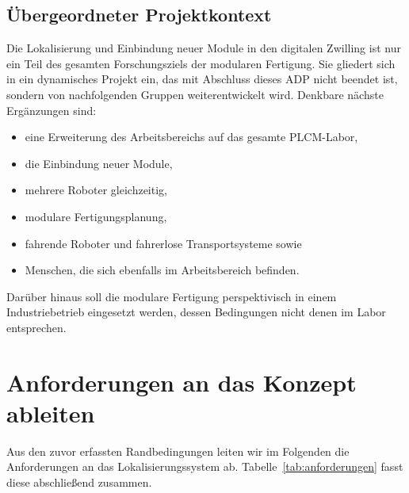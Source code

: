 \subsection{Übergeordneter Projektkontext}

Die Lokalisierung und Einbindung neuer Module in den digitalen Zwilling ist nur ein Teil des gesamten Forschungsziels der modularen Fertigung. Sie gliedert sich in ein dynamisches Projekt ein, das mit Abschluss dieses ADP nicht beendet ist, sondern von nachfolgenden Gruppen weiterentwickelt wird. Denkbare nächste Ergänzungen sind:
\begin{itemize}
    \item eine Erweiterung des Arbeitsbereichs auf das gesamte PLCM-Labor,
    \item die Einbindung neuer Module,
    \item mehrere Roboter gleichzeitig,
    \item modulare Fertigungsplanung,
    \item fahrende Roboter und fahrerlose Transportsysteme sowie
    \item Menschen, die sich ebenfalls im Arbeitsbereich befinden.
\end{itemize}
Darüber hinaus soll die modulare Fertigung perspektivisch in einem Industriebetrieb eingesetzt werden, dessen Bedingungen nicht denen im Labor entsprechen.

\section{Anforderungen an das Konzept ableiten}
\label{sec:Anforderungen an das Konzept ableiten}

Aus den zuvor erfassten Randbedingungen leiten wir im Folgenden die Anforderungen an das Lokalisierungssystem ab. Tabelle~\ref{tab:anforderungen} fasst diese abschließend zusammen.

